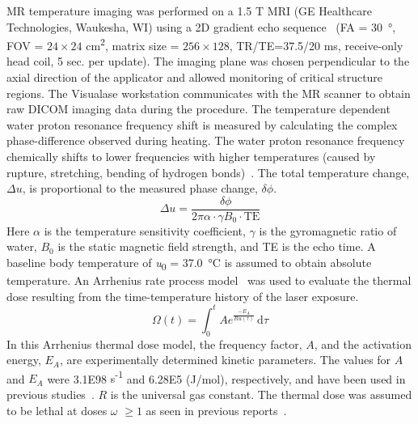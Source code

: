 \documentclass[12pt]{article}
\newcommand{\numberofpatientsLOOCV}{22 }
\begin{document}
MR temperature imaging was performed on a 1.5 T MRI
(GE Healthcare Technologies, Waukesha, WI)
using a 2D gradient echo sequence~\cite{staffordetal04} 
(FA = \SI{30}{\degree}, FOV = $24 \times 24$ cm\textsuperscript{2}, matrix size = $256 \times 128$, 
TR/TE=37.5/20 ms, receive-only head coil,  
5 sec. per update).
The imaging plane was chosen perpendicular to the axial direction of the applicator 
and allowed monitoring of critical structure regions.
The Visualase\textsuperscript{\textregistered} workstation communicates with the MR scanner to obtain
raw DICOM imaging data during the procedure.
The temperature dependent water proton resonance frequency shift is measured
by calculating the complex phase-difference observed during heating.
The water proton resonance frequency chemically shifts to lower
frequencies with higher temperatures (caused by rupture,
stretching, bending of hydrogen bonds)~\cite{ishihara1995paf}.
The total
temperature change, $\Delta u$, is proportional to the measured
phase change, $\delta \phi$.
\[
\Delta u = \frac{ \delta \phi } { 2 \pi \alpha \cdot \gamma B_0 \cdot \text{TE}}
\]
Here $\alpha$ is the temperature sensitivity coefficient, $\gamma$ is the
gyromagnetic ratio of water, $B_0$ is the static magnetic field strength, and
TE is the echo time.  
A baseline body temperature of \textit{u}\textsubscript{0} = \SI{37.0}{\degreeCelsius} is assumed to obtain
absolute temperature.
An Arrhenius rate process model~\cite{pearce1995rate}
was used to evaluate the thermal dose resulting from the
time-temperature history of the laser exposure.
\begin{equation}\label{ArrheniusDamage}
\text{$\Omega$}(t) = 
      \int_0^t \! Ae^{\frac{-E_A}{Ru(\tau)}} \, \mathrm{d} \tau
\end{equation}
In this Arrhenius thermal dose model, the frequency factor, $A$,
and the activation energy, $E_A$, are 
experimentally determined kinetic parameters. The values for $A$ and
$E_A$ were 3.1E98 {\color{red}s\textsuperscript{-1}} and 6.28E5 {\color{red}(J/mol)},
respectively, and have been used in previous
studies~\cite{carpentieretal08,schwarzmaier1998treatment,mcnichols2004mr}. 
$R$ is the universal gas constant.  The thermal dose was assumed to
be lethal at doses $\omega$  $\geq 1$ as seen in previous
reports~\cite{carpentieretal08,mcnichols2004mr}. 

\end{document}
